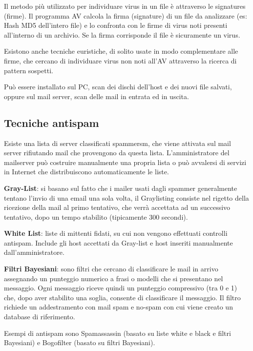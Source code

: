         Il metodo più utilizzato per individuare virus in un file è attraverso le signatures (firme). Il programma AV calcola la firma (signature) di un file da analizzare (es: Hash MD5 dell'intero file) e lo confronta con le firme di virus noti presenti all'interno di un archivio. Se la firma corrisponde il file è sicuramente un virus.
    
        Esistono anche tecniche euristiche, di solito usate in modo complementare alle firme, che cercano di individuare virus non noti all'AV attraverso la ricerca di pattern sospetti.
    
        Può essere installato sul PC, scan dei dischi dell'host e dei nuovi file salvati, oppure sul mail server, scan delle mail in entrata ed in uscita.

    \subsection{Tecniche antispam}
        Esiste una lista di server classificati spammersm, che viene attivata sul mail server rifiutando mail che provengono da questa lista. L'amministratore del mailserver può costruire manualmente una propria lista o può avvalersi di servizi in Internet che distribuiscono automaticamente le liste.
    
        \textbf{Gray-List}: si basano sul fatto che i mailer usati dagli spammer generalmente tentano l'invio di una email una sola volta, il Graylisting consiste nel rigetto della ricezione della mail al primo tentativo, che verrà accettata ad un successivo tentativo, dopo un tempo stabilito (tipicamente 300 secondi).
    
        \textbf{White List}: liste di mittenti fidati, su cui non vengono effettuati controlli antispam. Include gli host accettati da Gray-list e host inseriti manualmente dall'amministratore.
    
        \textbf{Filtri Bayesiani}: sono filtri che cercano di classificare le mail in arrivo assegnando un punteggio numerico a frasi o modelli che si presentano nel messaggio. Ogni messaggio riceve quindi un punteggio compressivo (tra 0 e 1) che, dopo aver stabilito una soglia, consente di classificare il messaggio. Il filtro richiede un addestramento con mail spam e no-spam con cui viene creato un database di riferimento.
    
        Esempi di antispam sono Spamassassin (basato su liste white e black e filtri Bayesiani) e Bogofilter (basato su filtri Bayesiani).
    
